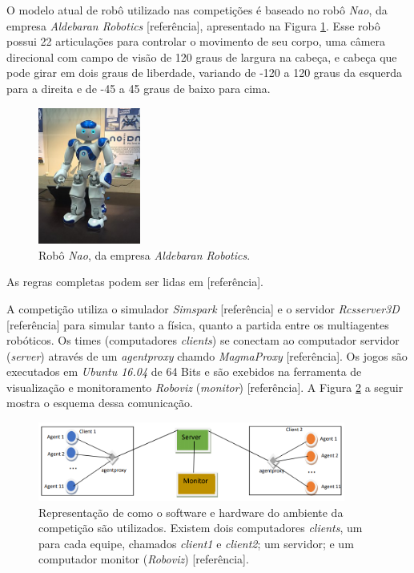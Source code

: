 \documentclass[a4paper,12pt]{article}
\begin{document}
O modelo atual de robô utilizado nas competições é baseado no robô \textit{Nao}, da empresa \textit{Aldebaran Robotics} [referência], apresentado na Figura \ref{fig:nao_robot}. Esse robô possui 22 articulações para controlar o movimento de seu corpo, uma câmera direcional com campo de visão de 120 graus de largura na cabeça, e cabeça que pode girar em dois graus de liberdade, variando de -120 a 120 graus da esquerda para a direita e de -45 a 45 graus de baixo para cima.

\begin{figure}[H]
	\centering
	\includegraphics[width=0.3\textwidth]{figures/nao-robot.jpg}
   \caption{Robô \textit{Nao}, da empresa \textit{Aldebaran Robotics}.} \label{fig:nao_robot}
\end{figure}

As regras completas podem ser lidas em [referência]\cite{cbr2008}.

A competição utiliza o simulador \textit{Simspark} [referência] e o servidor \textit{Rcsserver3D} [referência] para simular tanto a física, quanto a partida entre os multiagentes robóticos. Os times (computadores \textit{clients}) se conectam ao computador servidor (\textit{server}) através de um \textit{agentproxy} chamdo \textit{MagmaProxy} [referência]. Os jogos são executados em \textit{Ubuntu 16.04} de 64 Bits e são exebidos na ferramenta de visualização e monitoramento \textit{Roboviz} (\textit{monitor}) [referência]. A Figura \ref{fig:computers-schema} a seguir mostra o esquema dessa comunicação.

\begin{figure}[H]
	\centering
	\includegraphics[width=0.9\textwidth]{figures/computers-schema.png}
   \caption{Representação de como o software e hardware do ambiente da competição são utilizados. Existem dois computadores \textit{clients}, um para cada equipe, chamados \textit{client1} e \textit{client2}; um servidor; e um computador monitor (\textit{Roboviz}) [referência].} \label{fig:computers-schema}
\end{figure}
\end{document}
